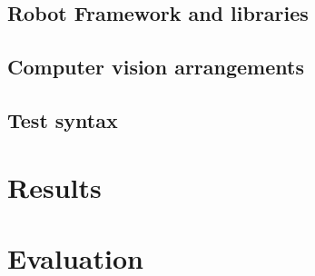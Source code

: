 \subsection{Robot Framework and libraries}
\label{subsection:Robot Framework and libraries}

\subsection{Computer vision arrangements}
\label{subsection:Computer vision arrangements}

\subsection{Test syntax}
\label{subsection:Test syntax}


\section{Results}
\label{section:Results}

\section{Evaluation}
\label{section:Evaluation}
